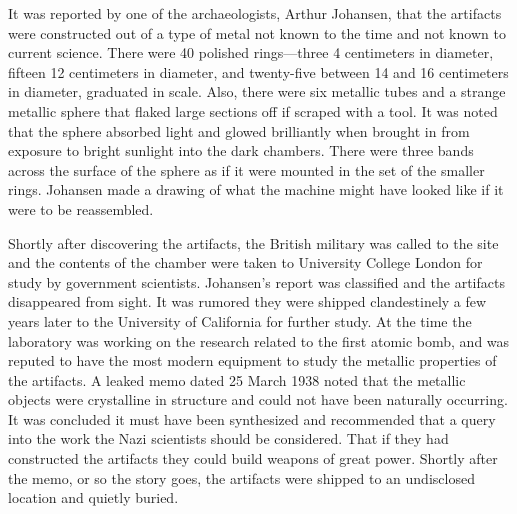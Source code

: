 \documentclass[
]{article}
\begin{document}
It was reported by one of the archaeologists, Arthur Johansen, that the
artifacts were constructed out of a type of metal not known to the time
and not known to current science. There were 40 polished rings---three 4
centimeters in diameter, fifteen 12 centimeters in diameter, and
twenty-five between 14 and 16 centimeters in diameter, graduated in
scale. Also, there were six metallic tubes and a strange metallic sphere
that flaked large sections off if scraped with a tool. It was noted that
the sphere absorbed light and glowed brilliantly when brought in from
exposure to bright sunlight into the dark chambers. There were three
bands across the surface of the sphere as if it were mounted in the set
of the smaller rings. Johansen made a drawing of what the machine might
have looked like if it were to be reassembled.

Shortly after discovering the artifacts, the British military was called
to the site and the contents of the chamber were taken to University
College London for study by government scientists. Johansen's report was
classified and the artifacts disappeared from sight. It was rumored they
were shipped clandestinely a few years later to the University of
California for further study. At the time the laboratory was working on
the research related to the first atomic bomb, and was reputed to have
the most modern equipment to study the metallic properties of the
artifacts. A leaked memo dated 25 March 1938 noted that the metallic
objects were crystalline in structure and could not have been naturally
occurring. It was concluded it must have been synthesized and
recommended that a query into the work the Nazi scientists should be
considered. That if they had constructed the artifacts they could build
weapons of great power. Shortly after the memo, or so the story goes,
the artifacts were shipped to an undisclosed location and quietly
buried.
\end{document}
